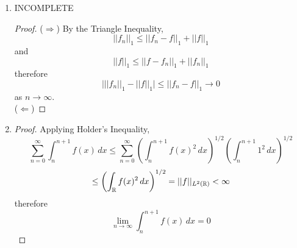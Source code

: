 \begin{enumerate}
\item INCOMPLETE
\begin{proof}
	($\Rightarrow$) By the Triangle Inequality,
		\[ ||f_n||_1 \le ||f_n - f||_1 + ||f||_1 \]
	and
		\[ ||f||_1 \le ||f-f_n||_1 + ||f_n||_1 \]
	therefore
		\[ \big| ||f_n||_1-||f||_1 \big| \le ||f_n-f||_1 \to 0\]
	as $n \to \infty$. \\
	($\Leftarrow$) 
\iffalse
First, we show that pointwise a.e. convergence implies convergence in measure since $[0,1]$ is a finite measure space: Fix $\epsilon >0$. Set $E_n = \{ |f_n-f| >\epsilon \}$. Since $f_n(x) \to f(x)$ for almost every $x \in [0,1]$, 
	\[ \mu\left( \bigcap_{n=1}^\infty E_n \right) = 0 \]
Also, we can find a subsequence of $\{E_n\}$ (still denoted by $E_n$) for which $E_n \supseteq E_{n+1}$. Then, for $E= \cap_{n=1}^\infty E_n =$,
	\[ 0=\mu(E)= 1-\mu(E^c) = 1- \mu\left( \bigcup_{n=1}^\infty E_n^c \right) = 1- \lim_{n\to\infty} \mu(E_n^c) = \lim_{n \to \infty} \mu(E_n) \]
Therefore $f_n \to f$ in measure. Now, 
	\[ \int_0^1 |f_n-f| \, d\mu = \int_{E_n}|f_n-f| \, d\mu - \int_{E_n^c} |f_n-f| \, d\mu \]
	\[ \le \mu(E_n) (\|f_n\|_1+\|f\|_1) + \epsilon \mu(E_n^c) \le 2C\mu(E_n)+\epsilon \]
which can be arbitrarily small for properly chosen $n$ and $\epsilon$. $C$ is the uniform bound on $\|f_n\|_1$ which exists since the sequence of real numbers $\{\|f_n\|_1\}_n$ is convergent.
\fi
\end{proof}

\item \begin{proof}
	Applying Holder's Inequality,
		\[ \sum_{n=0}^\infty \int_n^{n+1} f(x) \, dx \le \sum_{n=0}^\infty \left( \int_n^{n+1} f(x)^2 \, dx \right)^{1/2} \left( \int_n^{n+1} 1^2 \, dx \right)^{1/2} \]
		\[ \le \left( \int_{\mathbb{R}} f(x)^2 \, dx \right)^{1/2}= ||f||_{L^2(\mathbb{R})} < \infty \]
	therefore 
		\[ \lim_{n\to \infty} \int_n^{n+1} f(x) \, dx = 0\]
\end{proof}


\end{enumerate}